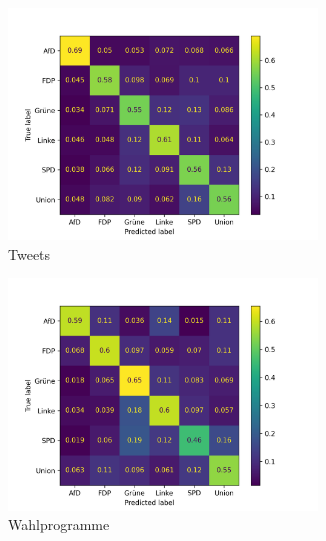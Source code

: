 \begin{figure}[H]
    \begin{subfigure}{0.5\textwidth}
      \centering
      \includegraphics[width=0.9\textwidth]{data/images/modeling/fasttext/none/tweets_confusion_matrix.png}
      \caption{Tweets} \label{sfig:confusionMatrixFastTextTweetsUnbalanced}
    \end{subfigure}
    \hfill
    \begin{subfigure}{0.5\textwidth}
      \centering
      \includegraphics[width=0.9\textwidth]{data/images/modeling/fasttext/none/party_programs_confusion_matrix.png}
      \caption{Wahlprogramme} \label{sfig:confusionMatrixFastTextManifestUnbalanced}
    \end{subfigure}
    \hfill
    \begin{subfigure}{0.5\textwidth}
      \centering

\end{subfigure}
\end{figure}
